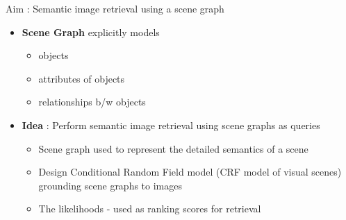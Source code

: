 \documentclass{IFES-beamer}
\begin{document}
        \begin{frame}{Aim : Semantic image retrieval using a scene graph }
            \begin{itemize}
                \item \textbf{Scene Graph} explicitly models
                    \begin{itemize}
                        \item objects 
                        \item attributes of objects
                        \item relationships b/w objects 
                    \end{itemize}
            \end{itemize}
            \vspace{4mm}
            \begin{itemize}
                \item \textbf{Idea} : Perform semantic image retrieval using scene graphs as queries
                    \begin{itemize}
                        \item Scene graph used to represent the detailed semantics of a scene
                        \item Design Conditional Random Field  model (CRF model of visual scenes) grounding scene graphs to images 
                        \item The likelihoods - used as ranking scores for retrieval
                    \end{itemize}
            \end{itemize}
        \end{frame}
\end{document}
